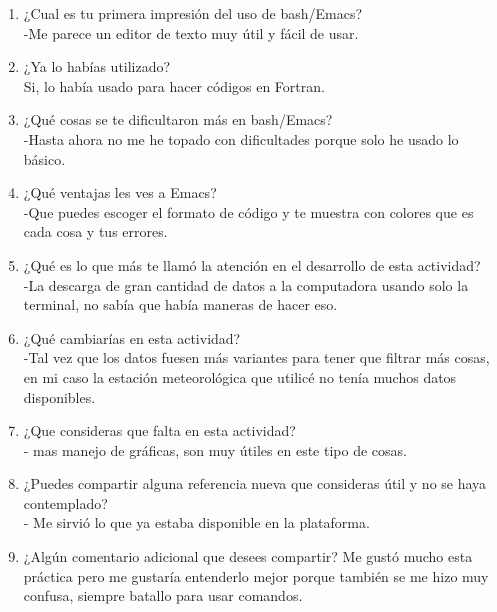 \documentclass[11pt]{article}
\begin{document}
\begin{enumerate}
\item ¿Cual es tu primera impresión del uso de bash/Emacs?
\\
-Me parece un editor de texto muy útil y fácil de usar.
\item ¿Ya lo habías utilizado?
\\
Si, lo había usado para hacer códigos en Fortran.
\item ¿Qué cosas se te dificultaron más en bash/Emacs?
\\  
-Hasta ahora no me he topado con dificultades porque solo he usado lo básico.
\item ¿Qué ventajas les ves a Emacs?
\\
-Que puedes escoger el formato de código y te muestra con colores que es cada cosa y tus errores.

\item ¿Qué es lo que más te llamó la atención en el desarrollo de esta actividad?
\\
-La descarga de gran cantidad de datos a la computadora usando solo la terminal, no sabía que había maneras de hacer eso.
\item ¿Qué cambiarías en esta actividad?
\\
-Tal vez que los datos fuesen más variantes para tener que filtrar más cosas, en mi caso la estación meteorológica que utilicé no tenía muchos datos disponibles.
\item ¿Que consideras que falta en esta actividad?
\\
- mas manejo de gráficas, son muy útiles en este tipo de cosas.
\item ¿Puedes compartir alguna referencia nueva que consideras útil y no se haya contemplado?
\\
- Me sirvió lo que ya estaba disponible en la plataforma.
\item ¿Algún comentario adicional que desees compartir?
Me gustó mucho esta práctica pero me gustaría entenderlo mejor porque también se me hizo muy confusa, siempre batallo para usar comandos.
\end{enumerate}
    
    
    
    
    
    
    
   
\end{document}

